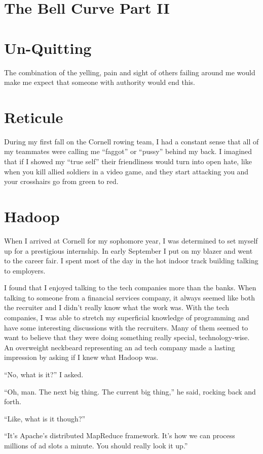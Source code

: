 \chapter{The Bell Curve Part II}


\chapter{Un-Quitting}
The combination of the yelling, pain and sight of others failing around me would
make me expect that someone with authority would end this.


\chapter{Reticule}
During my first fall on the Cornell rowing team, I had a constant sense that
all of my teammates were calling me ``faggot'' or ``pussy'' behind my back.  I
imagined that if I showed my ``true self'' their friendliness would turn into
open hate, like when you kill allied soldiers in a video game, and they start
attacking you and your crosshairs go from green to red.  


\chapter{Hadoop}
When I arrived at Cornell for my sophomore year, I was determined to set myself
up for a prestigious internship.  In early September I put on my blazer and went
to the career fair.  I spent most of the day in the hot indoor track building
talking to employers. 

I found that I enjoyed talking to the tech companies more than the banks.  When
talking to someone from a financial services company, it always seemed like both
the recruiter and I didn't really know what the work was.  With the tech
companies, I was able to stretch my superficial knowledge of programming and
have some interesting discussions with the recruiters.  Many of them seemed to
want to believe that they were doing something really special, technology-wise.
An overweight neckbeard representing an ad tech company made a lasting impression 
by asking if I knew what Hadoop was.  

``No, what is it?'' I asked.

``Oh, man.  The next big thing.  The current big thing,'' he said,
rocking back and forth.

``Like, what is it though?''

``It's Apache's distributed MapReduce framework.  It's how we can process
millions of ad slots a minute.  You should really look it up.''

